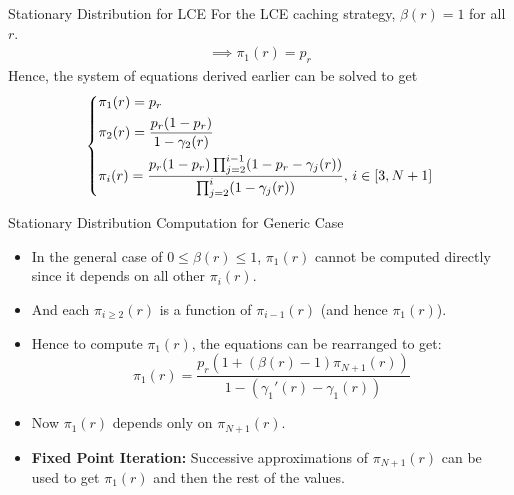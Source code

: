 \documentclass[
	xcolor={svgnames},
	hyperref={pagebackref,bookmarks},
	aspectratio=43,
]{beamer}
\begin{document}
\begin{frame}{Stationary Distribution for LCE}
    For the LCE caching strategy, $\beta(r) = 1$ for all $r$. \vspace{-2mm}
    \begin{align}
        \implies \pi_1(r) = p_r
    \end{align}
    Hence, the system of equations derived earlier can be solved to get
    \begin{equation}
        \begin{dcases*}
            \pi_1(r) = p_r \\
            \pi_2(r) = \frac{p_r(1-p_r)}{1 - \gamma_2(r)} \\
            \pi_i(r) = \frac{p_r(1-p_r)\prod_{j=2}^{i-1}(1 - p_r - \gamma_j(r))}{\prod_{j=2}^{i}(1 - \gamma_j(r))}, \, i \in \lbrack 3, N+1 \rbrack
        \end{dcases*}
    \end{equation}
\end{frame}

\begin{frame}{Stationary Distribution Computation for Generic Case}
    \begin{itemize}
        \item In the general case of $0 \leq \beta(r) \leq 1$, $\pi_1(r)$ cannot be computed directly since it depends on all other $\pi_i(r)$.
        \item And each $\pi_{i \ge 2}(r)$ is a function of $\pi_{i-1}(r)$ (and hence $\pi_1(r)$).
        \item Hence to compute $\pi_1(r)$, the equations can be rearranged to get: \vspace*{-2.5mm}
        \begin{equation}
            \pi_1(r) = \frac{p_r(1 + (\beta(r) - 1)\pi_{N+1}(r))}{1 - (\gamma_1'(r) - \gamma_1(r))}
        \end{equation} 
        \item Now $\pi_1(r)$ depends only on $\pi_{N+1}(r)$.
        \item \textbf{Fixed Point Iteration:} Successive approximations of $\pi_{N+1}(r)$ can be used to get $\pi_1(r)$ and then the rest of the values.
    \end{itemize}
\end{frame}
\end{document}
